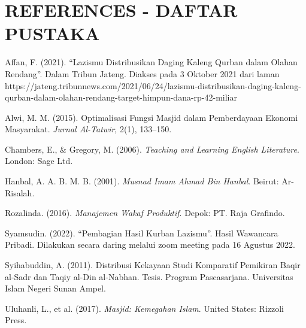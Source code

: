 \documentclass[12pt]{article}
\begin{document}
\section*{REFERENCES - DAFTAR PUSTAKA}
\begin{thebibliography}{9}
Affan, F. (2021). “Lazismu Distribusikan Daging Kaleng Qurban dalam Olahan Rendang”. Dalam Tribun Jateng. Diakses pada 3 Oktober 2021 dari laman https://jateng.tribunnews.com/2021/06/24/lazismu-distribusikan-daging-kaleng-qurban-dalam-olahan-rendang-target-himpun-dana-rp-42-miliar 

Alwi, M. M. (2015). Optimalisasi Fungsi Masjid dalam Pemberdayaan Ekonomi Masyarakat. \emph{Jurnal Al-Tatwir}, 2(1), 133–150.

Chambers, E., \& Gregory, M. (2006). \emph{Teaching and Learning English Literature}. London: Sage Ltd.

Hanbal, A. A. B. M. B. (2001). \emph{Musnad Imam Ahmad Bin Hanbal}. Beirut: Ar-Risalah.

Rozalinda. (2016). \emph{Manajemen Wakaf Produktif}. Depok: PT. Raja Grafindo.

Syamsudin. (2022). “Pembagian Hasil Kurban Lazismu”. Hasil Wawancara Pribadi. Dilakukan secara daring melalui zoom meeting pada 16 Agustus 2022.

Syihabuddin, A. (2011). Distribusi Kekayaan Studi Komparatif Pemikiran Baqir al-Sadr dan Taqiy al-Din al-Nabhan. Tesis. Program Pascasarjana. Universitas Islam Negeri Sunan Ampel.

Uluhanli, L., et al. (2017). \emph{Masjid: Kemegahan Islam}. United States: Rizzoli Press.
\end{thebibliography}
\end{document}
